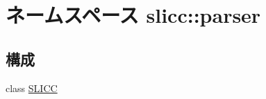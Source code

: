\hypertarget{namespaceslicc_1_1parser}{
\section{ネームスペース slicc::parser}
\label{namespaceslicc_1_1parser}
}
\subsection*{構成}
\begin{DoxyCompactItemize}
\item 
class \hyperlink{classslicc_1_1parser_1_1SLICC}{SLICC}
\end{DoxyCompactItemize}
